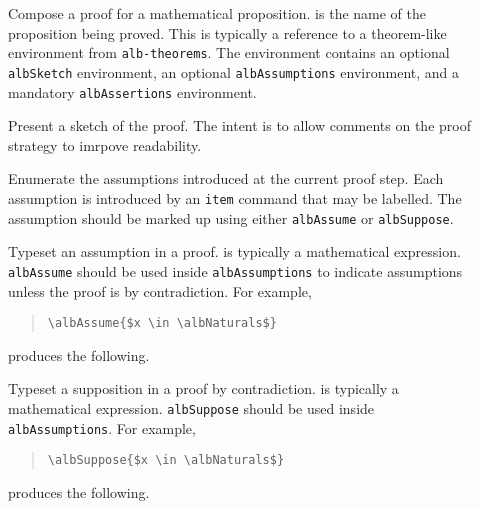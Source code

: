 \documentclass[11pt,a4paper,oneside,titlepage]{alb-latex}
\begin{document}
\begin{description}
\item[] Compose a proof for a
  mathematical proposition.   is the name of the
  proposition being proved.  This is typically a reference to a
  theorem-like environment from \texttt{alb-theorems}.  The environment
  contains an optional \texttt{albSketch} environment, an optional
  \texttt{albAssumptions} environment, and a mandatory
  \texttt{albAssertions} environment.

\item[] Present a sketch of the proof.  The intent
  is to allow comments on the proof strategy to imrpove readability.

\item[] Enumerate the assumptions introduced
  at the current proof step.  Each assumption is introduced by an
  \texttt{item} command that may be labelled.  The assumption should be
  marked up using either \texttt{albAssume} or \texttt{albSuppose}.

\item[] Typeset an assumption
  in a proof.   is typically a mathematical
  expression.  \texttt{albAssume} should be used inside
  \texttt{albAssumptions} to indicate assumptions unless the proof is by
  contradiction.  For example,
  \begin{quote}
\begin{verbatim}
\albAssume{$x \in \albNaturals$}
\end{verbatim}
  \end{quote}
  produces the following.
  \begin{quote}
  \end{quote}

\item[] Typeset a
  supposition in a proof by contradiction.   is
  typically a mathematical expression.  \texttt{albSuppose} should be
  used inside \texttt{albAssumptions}.  For example,
  \begin{quote}
\begin{verbatim}
\albSuppose{$x \in \albNaturals$}
\end{verbatim}
  \end{quote}
  produces the following.
  \begin{quote}
  \end{quote}


\end{description}
\end{document}
